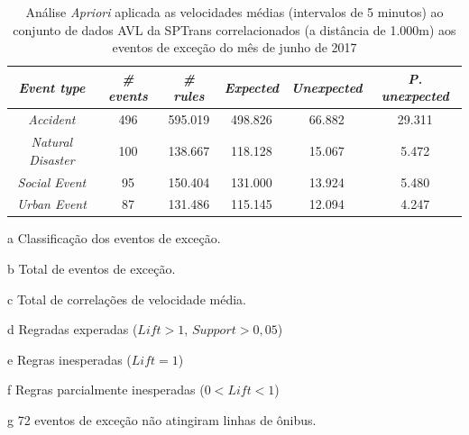 \documentclass[
	12pt,				%
	oneside,			%
	a4paper,			%
	english,			%
	brazil				%
	]{abntex2ppgsi}
\begin{document}
\begin{apendicesenv}
\begin{table}[!htb]
\centering
\begin{threeparttable}
\caption {Análise \textit{Apriori} aplicada as velocidades médias (intervalos de 5 minutos) ao conjunto de dados AVL da SPTrans correlacionados (a distância de 1.000m) aos eventos de exceção do mês de junho de 2017}
\label {tab:aprioriFull}
\begin{tabular}{c|c|c|c|c|c}
\hline
\textbf{\textit{Event type}}\tnote{a} & \textbf{\textit{\# events}}\tnote{b} & \textit{\textbf{\# rules}}\tnote{c} & \textbf{\textit{Expected}}\tnote{d} & \textbf{\textit{Unexpected}}\tnote{e} & \textbf{\textit{P. unexpected}}\tnote{f}   \\
\hline
\textit{Accident} & 496 & 595.019 & 498.826 & 66.882 & 29.311 \\
\textit{Natural Disaster} & 100 & 138.667 & 118.128 & 15.067 & 5.472 \\
\textit{Social Event} & 95 & 150.404 & 131.000 & 13.924 & 5.480 \\
\textit{Urban Event} & 87 & 131.486 & 115.145 & 12.094 & 4.247 \\
\hline
\end{tabular}
\begin{tablenotes}
            \item[a] Classificação dos eventos de exceção.
            \item[b] Total de eventos de exceção.
            \item[c] Total de correlações de velocidade média.
            \item[d] Regradas experadas ($Lift > 1$, $Support > 0,05$)
            \item[e] Regras inesperadas ($Lift = 1$)
            \item[f] Regras parcialmente inesperadas ($0 < Lift < 1$)
            \item[g] 72 eventos de exceção não atingiram linhas de ônibus.
        \end{tablenotes}
\end{threeparttable}
\end{table}



\end{apendicesenv}
\end{document}
